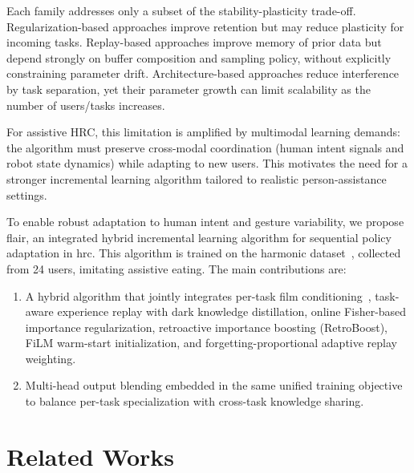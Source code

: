 \documentclass[3p,times,procedia]{elsarticle}
\begin{document}
Each family addresses only a subset of the stability-plasticity trade-off. Regularization-based approaches improve retention but may reduce plasticity for incoming tasks. Replay-based approaches improve memory of prior data but depend strongly on buffer composition and sampling policy, without explicitly constraining parameter drift. Architecture-based approaches reduce interference by task separation, yet their parameter growth can limit scalability as the number of users/tasks increases.

For assistive HRC, this limitation is amplified by multimodal learning demands: the algorithm must preserve cross-modal coordination (human intent signals and robot state dynamics) while adapting to new users. This motivates the need for a stronger incremental learning algorithm tailored to realistic person-assistance settings.

To enable robust adaptation to human intent and gesture variability, we propose \ac{flair}, an integrated hybrid incremental learning algorithm for sequential policy adaptation in \ac{hrc}. This algorithm is trained on the \ac{harmonic} dataset~\cite{newman2022harmonic}, collected from 24 users, imitating assistive eating. The main contributions are:

\begin{enumerate}
    \item A hybrid algorithm that jointly integrates per-task \ac{film} conditioning~\cite{perez2018film}, task-aware experience replay with dark knowledge distillation, online Fisher-based importance regularization, retroactive importance boosting (RetroBoost), FiLM warm-start initialization, and forgetting-proportional adaptive replay weighting.
    \item Multi-head output blending embedded in the same unified training objective to balance per-task specialization with cross-task knowledge sharing.
\end{enumerate}

\section{Related Works}
\end{document}
